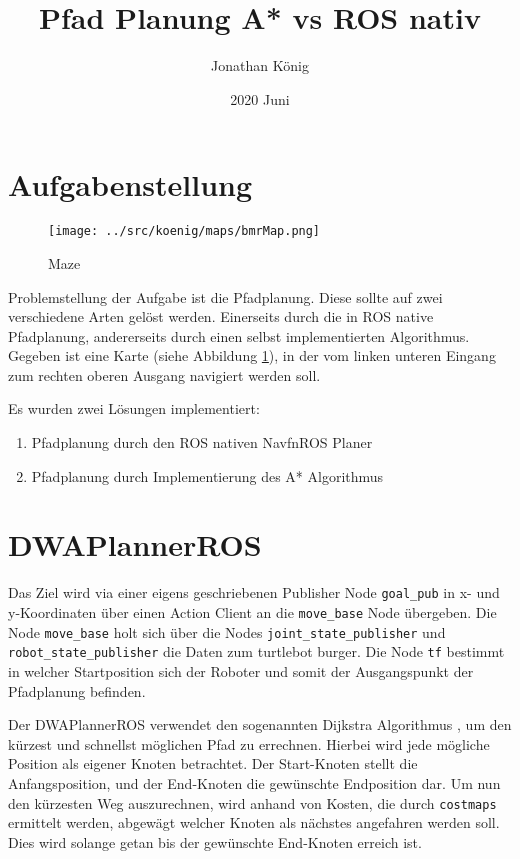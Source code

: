 \documentclass{article}
\title{Pfad Planung A* vs ROS nativ}
\date{2020 Juni}
\author{Jonathan König}
\begin{document}
\maketitle
\newpage

\tableofcontents

\newpage
\clearpage
{}

\section{Aufgabenstellung}

\begin{figure}[!htbp]
    \centering
    \texttt{[image: ../src/koenig/maps/bmrMap.png]}
    \caption{Maze}\label{map}
\end{figure}

Problemstellung der Aufgabe ist die Pfadplanung. Diese sollte auf zwei verschiedene Arten gelöst werden. Einerseits durch die in ROS native Pfadplanung, andererseits durch einen selbst implementierten Algorithmus.
Gegeben ist eine Karte (siehe Abbildung \ref{map}), in der vom linken unteren Eingang zum rechten oberen Ausgang navigiert werden soll.

Es wurden zwei Lösungen implementiert:
\begin{enumerate}
    \item Pfadplanung durch den ROS nativen NavfnROS Planer
    \item Pfadplanung durch Implementierung des A* Algorithmus 
\end{enumerate}

\section{DWAPlannerROS }
\label{DWAPlannerROS}

Das Ziel wird via einer eigens geschriebenen Publisher Node \verb|goal_pub| in x- und y-Koordinaten über einen Action Client an die \verb|move_base| Node übergeben.
Die Node \verb|move_base| holt sich über die Nodes \verb|joint_state_publisher| und \verb|robot_state_publisher| die Daten zum turtlebot burger. Die Node \verb|tf| bestimmt in welcher Startposition sich der Roboter und somit der Ausgangspunkt der Pfadplanung befinden.

Der DWAPlannerROS verwendet den sogenannten Dijkstra Algorithmus \cite[1]{Dijkstra}, um den kürzest und schnellst möglichen Pfad zu errechnen. Hierbei wird jede mögliche Position als eigener Knoten betrachtet. Der Start-Knoten stellt die Anfangsposition, und der End-Knoten die gewünschte Endposition dar. Um nun den kürzesten Weg auszurechnen, wird anhand von Kosten, die durch \verb|costmaps| ermittelt werden, abgewägt welcher Knoten als nächstes angefahren werden soll. Dies wird solange getan bis der gewünschte End-Knoten erreich ist. 
\end{document}
